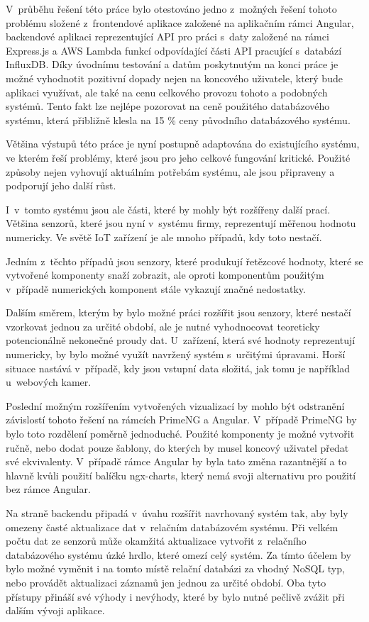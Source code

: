 V~průběhu řešení této práce bylo otestováno jedno z~možných řešení tohoto problému složené z~frontendové aplikace založené na aplikačním rámci Angular, backendové aplikaci reprezentující API pro práci s~daty založené na rámci Express.js a AWS Lambda funkcí odpovídající části API pracující s~databází InfluxDB. Díky úvodnímu testování a datům poskytnutým na konci práce je možné vyhodnotit pozitivní dopady nejen na koncového uživatele, který bude aplikaci využívat, ale také na cenu celkového provozu tohoto a podobných systémů. Tento fakt lze nejlépe pozorovat na ceně použitého databázového systému, která přibližně klesla na 15 \% ceny původního databázového systému. 

Většina výstupů této práce je nyní postupně adaptována do existujícího systému, ve kterém řeší problémy, které jsou pro jeho celkové fungování kritické. Použité způsoby nejen vyhovují aktuálním potřebám systému, ale jsou připraveny a podporují jeho další růst. 

I~v~tomto systému jsou ale části, které by mohly být rozšířeny další prací. Většina senzorů, které jsou nyní v~systému firmy, reprezentují měřenou hodnotu numericky. Ve světě IoT zařízení je ale mnoho případů, kdy toto nestačí. 

Jedním z~těchto případů jsou senzory, které produkují řetězcové hodnoty, které se vytvořené komponenty snaží zobrazit, ale oproti komponentům použitým v~případě numerických komponent stále vykazují značné nedostatky.

Dalším směrem, kterým by bylo možné práci rozšířit jsou senzory, které nestačí vzorkovat jednou za určité období, ale je nutné vyhodnocovat teoreticky potencionálně nekonečné proudy dat. U~zařízení, která své hodnoty reprezentují numericky, by bylo možné využít navržený systém s~určitými úpravami. Horší situace nastává v~případě, kdy jsou vstupní data složitá, jak tomu je například u~webových kamer. 

Poslední možným rozšířením vytvořených vizualizací by mohlo být odstranění závislostí tohoto řešení na rámcích PrimeNG a Angular. V~případě PrimeNG by bylo toto rozdělení poměrně jednoduché. Použité komponenty je možné vytvořit ručně, nebo dodat pouze šablony, do kterých by musel koncový uživatel předat své ekvivalenty. V~případě rámce Angular by byla tato změna razantnější a to hlavně kvůli použití balíčku ngx-charts, který nemá svoji alternativu pro použití bez rámce Angular.

Na straně backendu připadá v~úvahu rozšířit navrhovaný systém tak, aby byly omezeny časté aktualizace dat v~relačním databázovém systému. Při velkém počtu dat ze senzorů může okamžitá aktualizace vytvořit z~relačního databázového systému úzké hrdlo, které omezí celý systém. Za tímto účelem by bylo možné vyměnit i na tomto místě relační databázi za vhodný NoSQL typ, nebo provádět aktualizaci záznamů jen jednou za určité období. Oba tyto přístupy přináší své výhody i nevýhody, které by bylo nutné pečlivě zvážit při dalším vývoji aplikace.
